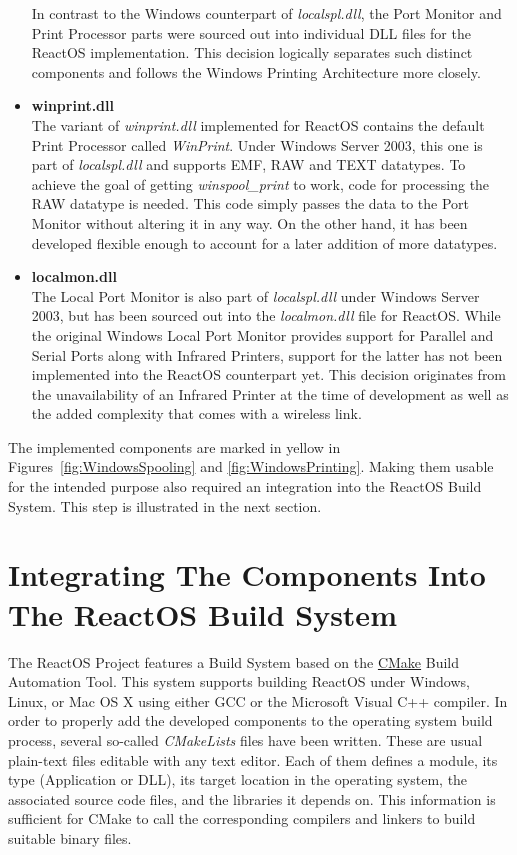 \begin{itemize}
				In contrast to the Windows counterpart of \emph{localspl.dll}, the Port Monitor and Print Processor parts were sourced out into individual \gls{DLL} files for the ReactOS implementation.
				This decision logically separates such distinct components and follows the Windows Printing Architecture more closely.
				
	\item \textbf{winprint.dll} \\
				The variant of \emph{winprint.dll} implemented for ReactOS contains the default Print Processor called \emph{WinPrint}.
				Under Windows Server 2003, this one is part of \emph{localspl.dll} and supports \gls{EMF}, RAW and TEXT datatypes.
				To achieve the goal of getting \emph{winspool\_print} to work, code for processing the RAW datatype is needed.
				This code simply passes the data to the Port Monitor without altering it in any way.
				On the other hand, it has been developed flexible enough to account for a later addition of more datatypes.
				
	\item \textbf{localmon.dll} \\
				The Local Port Monitor is also part of \emph{localspl.dll} under Windows Server 2003, but has been sourced out into the \emph{localmon.dll} file for ReactOS.
				While the original Windows Local Port Monitor provides support for Parallel and Serial Ports along with Infrared Printers, support for the latter has not been implemented into the ReactOS counterpart yet.
				This decision originates from the unavailability of an Infrared Printer at the time of development as well as the added complexity that comes with a wireless link.
\end{itemize}

The implemented components are marked in yellow in Figures~\ref{fig:WindowsSpooling} and \ref{fig:WindowsPrinting}.
Making them usable for the intended purpose also required an integration into the ReactOS Build System.
This step is illustrated in the next section.


\section{Integrating The Components Into The ReactOS Build System}
The ReactOS Project features a Build System based on the \href{http://www.cmake.org/}{CMake} Build Automation Tool.
This system supports building ReactOS under Windows, Linux, or Mac OS X using either GCC or the Microsoft Visual C++ compiler.
In order to properly add the developed components to the operating system build process, several so-called \emph{CMakeLists} files have been written.
These are usual plain-text files editable with any text editor.
Each of them defines a module, its type (Application or \gls{DLL}), its target location in the operating system, the associated source code files, and the libraries it depends on.
This information is sufficient for CMake to call the corresponding compilers and linkers to build suitable binary files.


